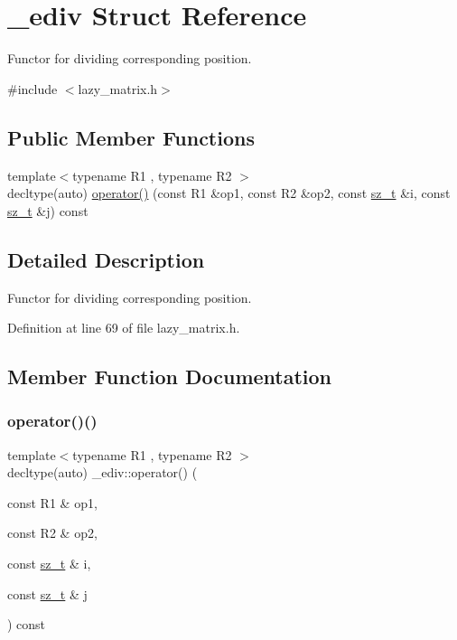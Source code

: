 \hypertarget{struct__ediv}{}\section{\+\_\+ediv Struct Reference}
\label{struct__ediv}


Functor for dividing corresponding position.  




{\ttfamily \#include $<$lazy\+\_\+matrix.\+h$>$}

\subsection*{Public Member Functions}
\begin{DoxyCompactItemize}
\item 
{\footnotesize template$<$typename R1 , typename R2 $>$ }\\decltype(auto) \mbox{\hyperlink{struct__ediv_a08f342384bcd24860a08b378e4573662}{operator()}} (const R1 \&op1, const R2 \&op2, const \mbox{\hyperlink{lazy__matrix_8h_acba2745dcfc55b2d05ff45adc6a0a015}{sz\+\_\+t}} \&i, const \mbox{\hyperlink{lazy__matrix_8h_acba2745dcfc55b2d05ff45adc6a0a015}{sz\+\_\+t}} \&j) const
\end{DoxyCompactItemize}


\subsection{Detailed Description}
Functor for dividing corresponding position. 

Definition at line 69 of file lazy\+\_\+matrix.\+h.



\subsection{Member Function Documentation}
\mbox{\label{struct__ediv_a08f342384bcd24860a08b378e4573662}} 
\subsubsection{\texorpdfstring{operator()()}{operator()()}}
{\footnotesize\ttfamily template$<$typename R1 , typename R2 $>$ \\
decltype(auto) \+\_\+ediv\+::operator() (\begin{DoxyParamCaption}\item[{const R1 \&}]{op1,  }\item[{const R2 \&}]{op2,  }\item[{const \mbox{\hyperlink{lazy__matrix_8h_acba2745dcfc55b2d05ff45adc6a0a015}{sz\+\_\+t}} \&}]{i,  }\item[{const \mbox{\hyperlink{lazy__matrix_8h_acba2745dcfc55b2d05ff45adc6a0a015}{sz\+\_\+t}} \&}]{j }\end{DoxyParamCaption}) const\hspace{0.3cm}{\ttfamily [inline]}}



